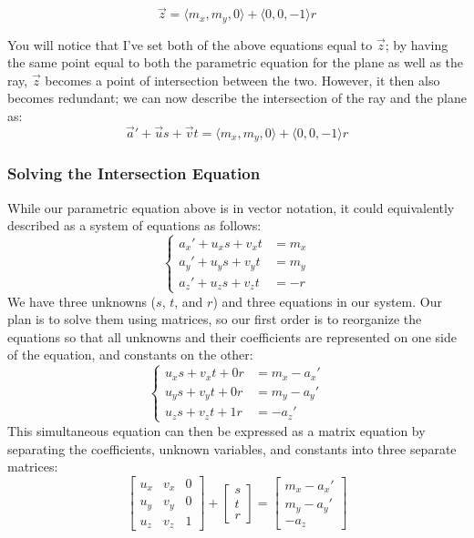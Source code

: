     \begin{equation}
    \vec{z}=\langle m_x, m_y, 0 \rangle + \langle 0, 0, -1 \rangle r
    \end{equation}
\par You will notice that I've set both of the above equations equal to $\vec{z}$; by having the same point equal to both the parametric equation for the plane as well as the ray, $\vec{z}$ becomes a point of intersection between the two. However, it then also becomes redundant; we can now describe the intersection of the ray and the plane as:
    \begin{equation}
    \vec{a}'+\vec{u}s+\vec{v}t=\langle m_x, m_y, 0 \rangle + \langle 0, 0, -1 \rangle r
    \end{equation}

\subsubsection{Solving the Intersection Equation}
While our parametric equation above is in vector notation, it could equivalently described as a system of equations as follows:
    \begin{equation}
    \begin{cases}
        a_x'+u_x s + v_x t & =  m_x \\
        a_y'+u_y s + v_y t & =  m_y \\
        a_z'+u_z s + v_z t & =  -r
    \end{cases}
    \end{equation}
We have three unknowns ($s$, $t$, and $r$) and three equations in our system. Our plan is to solve them using matrices, so our first order is to reorganize the equations so that all unknowns and their coefficients are represented on one side of the equation, and constants on the other:
    \begin{equation}
    \begin{cases}
        u_x s + v_x t + 0r & =  m_x - a_x' \\
        u_y s + v_y t + 0r & =  m_y - a_y' \\
        u_z s + v_z t + 1r & =  -a_z'
    \end{cases}
    \end{equation}
This simultaneous equation can then be expressed as a matrix equation by separating the coefficients, unknown variables, and constants into three separate matrices:
    \begin{equation}
    \begin{bmatrix}
        u_x & v_x & 0 \\
        u_y & v_y & 0 \\
        u_z & v_z & 1
    \end{bmatrix}
    +
    \begin{bmatrix}
        s \\
        t \\
        r
    \end{bmatrix}
    =
    \begin{bmatrix}
    m_x - a_x' \\
    m_y - a_y' \\
    -a_z
    \end{bmatrix}
    \end{equation}
